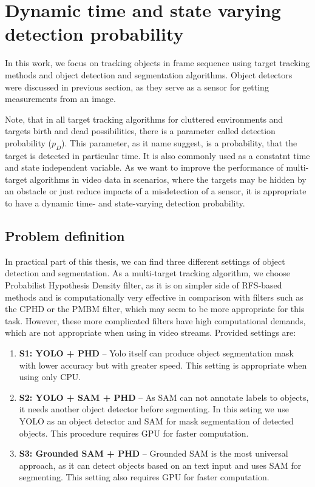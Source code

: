\chapter{Dynamic time and state varying detection probability}
In this work, we focus on tracking objects in frame sequence using target tracking methods and object detection and
segmentation algorithms. Object detectors were discussed in previous section, as they serve as a sensor for getting
measurements from an image.

Note, that in all target tracking algorithms for cluttered environments and targets
birth and dead possibilities, there is a parameter called detection probability ($p_D$). This parameter, as it name
suggest, is a probability, that the target is detected in particular time. It is also commonly used as a constatnt
time and state independent variable. As we want to improve the performance of multi-target algorithms in video data
in scenarios, where the targets may be hidden by an obstacle or just reduce impacts of a misdetection of a sensor, it
is appropriate to have a dynamic time- and state-varying detection probability.
\section{Problem definition}
In practical part of this thesis, we can find three different settings of object detection and segmentation.
As a multi-target tracking algorithm, we choose Probabilist Hypothesis Density filter, as it is on simpler side of
RFS-based methods and is computationally very effective in comparison with filters such as the CPHD or the PMBM filter,
which may seem
to be more appropriate for this task. However, these more complicated filters have high computational demands, which
are not appropriate when using in video streams. Provided settings are:
\begin{enumerate}
  \item \textbf{S1: YOLO + PHD} -- Yolo itself can produce object segmentation mask with lower accuracy but with greater
  speed. This setting is appropriate when using only CPU.
  \item \textbf{S2: YOLO + SAM + PHD} -- As SAM can not annotate labels to objects, it needs another object detector
  before segmenting. In this seting we use YOLO as an object detector and SAM for mask segmentation of detected
  objects. This procedure requires GPU for faster computation.
  \item \textbf{S3: Grounded SAM + PHD} -- Grounded SAM is the most universal approach, as it can detect objects based
  on an text input and uses SAM for segmenting. This setting also requires GPU for faster computation.
\end{enumerate}


